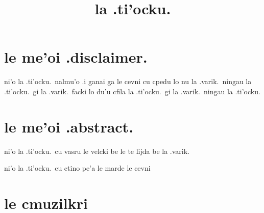 \documentclass{report}
\title{la .ti'ocku.}
\begin{document}
\maketitle

\chapter{le me'oi .disclaimer.}
ni'o la .ti'ocku.\ nalmu'o  .i ganai ga le cevni cu cpedu lo nu la .varik.\ ningau la .ti'ocku.\ gi la .varik.\ facki lo du'u cfila la .ti'ocku.\ gi la .varik.\ ningau la .ti'ocku.

\chapter{le me'oi .abstract.}
ni'o la .ti'ocku.\ cu vasru le velcki be le te lijda be la .varik.

ni'o la .ti'ocku.\ cu ctino pe'a le marde le cevni

\chapter{le cmuzilkri}
\end{document}
